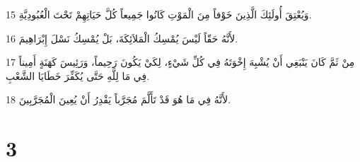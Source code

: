 \par 15 وَيُعْتِقَ أُولَئِكَ الَّذِينَ خَوْفاً مِنَ الْمَوْتِ كَانُوا جَمِيعاً كُلَّ حَيَاتِهِمْ تَحْتَ الْعُبُودِيَّةِ.
\par 16 لأَنَّهُ حَقّاً لَيْسَ يُمْسِكُ الْمَلاَئِكَةَ، بَلْ يُمْسِكُ نَسْلَ إِبْرَاهِيمَ.
\par 17 مِنْ ثَمَّ كَانَ يَنْبَغِي أَنْ يُشْبِهَ إِخْوَتَهُ فِي كُلِّ شَيْءٍ، لِكَيْ يَكُونَ رَحِيماً، وَرَئِيسَ كَهَنَةٍ أَمِيناً فِي مَا لِلَّهِ حَتَّى يُكَفِّرَ خَطَايَا الشَّعْبِ.
\par 18 لأَنَّهُ فِي مَا هُوَ قَدْ تَأَلَّمَ مُجَرَّباً يَقْدِرُ أَنْ يُعِينَ الْمُجَرَّبِينَ.

\chapter{3}

